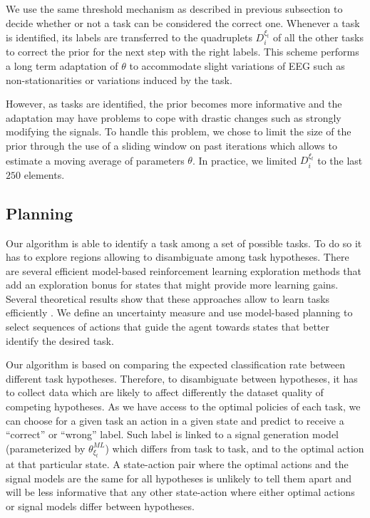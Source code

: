 \documentclass[letterpaper]{article}
\begin{document}
We use the same threshold mechanism as described in previous subsection to decide whether or not a task can be considered the correct one. Whenever a task is identified, its labels are transferred to the quadruplets $D^{\xi_t}_{i}$ of all the other tasks to correct the prior for the next step with the right labels. This scheme performs a long term adaptation of $\theta$ to accommodate slight variations of EEG such as non-stationarities or variations induced by the task. 

However, as tasks are identified, the prior becomes more informative and the adaptation may have problems to cope with drastic changes such as strongly modifying the signals. To handle this problem, we chose to limit the size of the prior through the use of a sliding window on past iterations which allows to estimate a moving average of parameters $\theta$. In practice, we limited $D^{\xi_t}_{i}$ to the last $250$ elements.

\subsection{Planning}
\label{alg:planning}

Our algorithm is able to identify a task among a set of possible tasks. To do so it has to explore regions allowing to disambiguate among task hypotheses. There are several efficient model-based reinforcement learning exploration methods that add an exploration bonus for states that might provide more learning gains. Several theoretical results show that these approaches allow to learn tasks efficiently \cite{brafman2003r,kolter2009near}. We define an uncertainty measure and use model-based planning to select sequences of actions that guide the agent towards states that better identify the desired task.

Our algorithm is based on comparing the expected classification rate between different task hypotheses. Therefore, to disambiguate between hypotheses, it has to collect data which are likely to affect differently the dataset quality of competing hypotheses. As we have access to the optimal policies of each task, we can choose for a given task an action in a given state and predict to receive a ``correct'' or ``wrong'' label. Such label is linked to a signal generation model (parameterized by $\theta^{ML}_{\xi_t}$) which differs from task to task, and to the optimal action at that particular state. A state-action pair where the optimal actions and the signal models are the same for all hypotheses is unlikely to tell them apart and will be less informative that any other state-action where either optimal actions or signal models differ between hypotheses.
\end{document}
